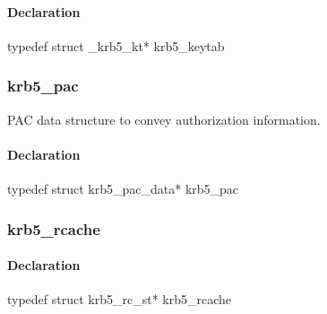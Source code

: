 \documentclass[letterpaper,10pt,english]{sphinxmanual}
\begin{document}
\begin{fulllineitems}
\label{appdev/refs/types/krb5_keytab:krb5_keytab}
\end{fulllineitems}



\paragraph{Declaration}
\label{appdev/refs/types/krb5_keytab:declaration}
typedef struct \_krb5\_kt* krb5\_keytab


\subsubsection{krb5\_pac}
\label{appdev/refs/types/krb5_pac:krb5-pac-struct}\label{appdev/refs/types/krb5_pac:krb5-pac}\label{appdev/refs/types/krb5_pac::doc}

\begin{fulllineitems}
\label{appdev/refs/types/krb5_pac:krb5_pac}
\end{fulllineitems}


PAC data structure to convey authorization information.


\paragraph{Declaration}
\label{appdev/refs/types/krb5_pac:declaration}
typedef struct krb5\_pac\_data* krb5\_pac


\subsubsection{krb5\_rcache}
\label{appdev/refs/types/krb5_rcache:krb5-rcache-struct}\label{appdev/refs/types/krb5_rcache::doc}\label{appdev/refs/types/krb5_rcache:krb5-rcache}

\begin{fulllineitems}
\label{appdev/refs/types/krb5_rcache:krb5_rcache}
\end{fulllineitems}



\paragraph{Declaration}
\label{appdev/refs/types/krb5_rcache:declaration}
typedef struct krb5\_rc\_st* krb5\_rcache
\end{document}
